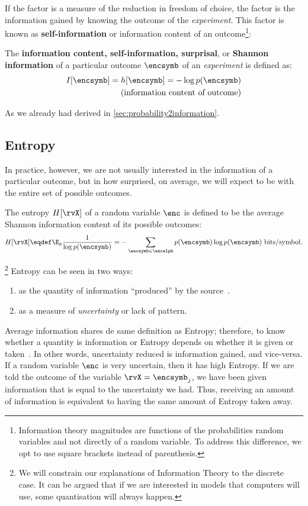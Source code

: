 If the factor is a measure of the reduction in freedom of choice, the factor is the information gained by knowing the outcome of the \emph{experiment}. This factor is known as \textbf{self-information} or information content of an outcome\footnote{Information theory magnitudes are functions of the probabilities random variables and not directly of a random variable. To address this difference, we opt to use square brackets instead of parenthesis.}:
\begin{definition}\label{def:surprisal}
	The \textbf{information content, self-information, surprisal}, or \textbf{Shannon information} of a particular outcome \(\encsymb\) of an \emph{experiment} is defined as:
	\begin{align}
		I[\encsymb] = h[\encsymb]= -\log p(\encsymb)\\
		\tag{information content of outcome}
	\end{align}
\end{definition}
As we already had derived in \cref{sec:probability2information}.

\subsection{Entropy} In practice, however, we are not usually interested in the information of a particular outcome, but in how surprised, on average, we will expect to be with the entire set of possible outcomes.
\begin{definition}
	The entropy \(H[\rvX]\) of a random variable \(\enc\) is defined to be the average Shannon information content of its possible outcomes:
	\begin{align}
		H[\rvX] \eqdef \E_p \frac{1}{\log p(\encsymb)} = -\sum_{\encsymb \in \encalph} p(\encsymb) \log p(\encsymb) \text{ bits/symbol}.
	\label{eq:entropy} \end{align}
\end{definition}
\footnote{We will constrain our explanations of Information Theory to the discrete case. It can be argued that if we are interested in models that computers will use, some quantisation will always happen.}
Entropy can be seen in two ways:
\begin{enumerate}
	\item as the quantity of information ``produced'' by the source~\cite[p.18]{shannon:1949}.
	\item as a measure of \emph{uncertainty} or lack of pattern.
\end{enumerate}
Average information shares de same definition as Entropy; therefore, to know whether a quantity is information or Entropy depends on whether it is given or taken~\cite{stone:2015}. In other words, uncertainty reduced is information gained, and vice-versa. If a random variable \(\enc\) is very uncertain, then it has high Entropy. If we are told the outcome of the variable \(\rvX = \encsymb_j\), we have been given information that is equal to the uncertainty we had. Thus, receiving an amount of information is equivalent to having the same amount of Entropy taken away.

